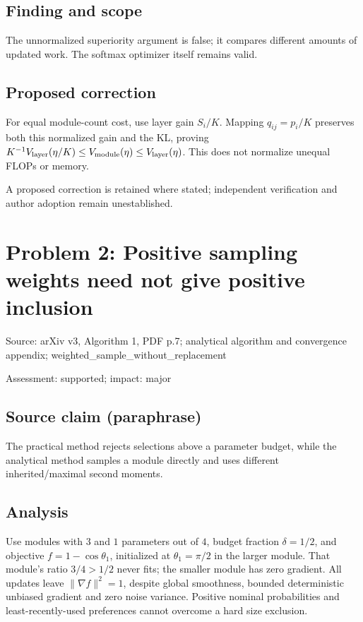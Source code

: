 \documentclass[11pt]{article}
\begin{document}
\subsection*{Finding and scope}

The unnormalized superiority argument is false; it compares different amounts of updated work. The softmax optimizer itself remains valid.

\subsection*{Proposed correction}

For equal module-count cost, use layer gain \(S_i/K\). Mapping \(q_{ij}=p_i/K\) preserves both this normalized gain and the KL, proving \(K^{-1}V_{\rm layer}(\eta/K)\le V_{\rm module}(\eta)\le V_{\rm layer}(\eta)\). This does not normalize unequal FLOPs or memory.

A proposed correction is retained where stated; independent verification and author adoption remain unestablished.

\section*{Problem 2: Positive sampling weights need not give positive inclusion}

Source: arXiv v3, Algorithm 1, PDF p.7; analytical algorithm and convergence appendix; weighted\_sample\_without\_replacement

Assessment: supported; impact: major

\subsection*{Source claim (paraphrase)}

The practical method rejects selections above a parameter budget, while the analytical method samples a module directly and uses different inherited/maximal second moments.

\subsection*{Analysis}

Use modules with \(3\) and \(1\) parameters out of \(4\), budget fraction \(\delta=1/2\), and objective \(f=1-\cos\theta_1\), initialized at \(\theta_1=\pi/2\) in the larger module. That module’s ratio \(3/4>1/2\) never fits; the smaller module has zero gradient. All updates leave \(\|\nabla f\|^2=1\), despite global smoothness, bounded deterministic unbiased gradient and zero noise variance. Positive nominal probabilities and least-recently-used preferences cannot overcome a hard size exclusion.
\end{document}
